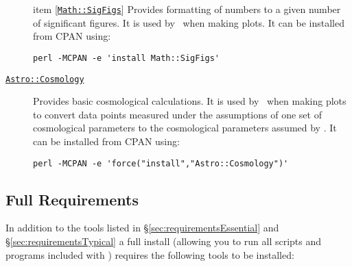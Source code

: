 \begin{description}
item [\href{http://search.cpan.org/~sbeck/Math-SigFigs-1.09/lib/Math/SigFigs.pod}{{\tt Math::SigFigs}}] Provides formatting of numbers to a given number of significant figures. It is used by \glc\ when making plots. It can be installed from CPAN using:
\begin{verbatim}
perl -MCPAN -e 'install Math::SigFigs'
\end{verbatim}

\item [\href{http://search.cpan.org/~djburke/Astro-Cosmology-0.90/Cosmology.pm}{{\tt Astro::Cosmology}}] Provides basic cosmological calculations. It is used by \glc\ when making plots to convert data points measured under the assumptions of one set of cosmological parameters to the cosmological parameters assumed by \glc. It can be installed from CPAN using:
\begin{verbatim}
perl -MCPAN -e 'force("install","Astro::Cosmology")'
\end{verbatim}
\end{description}

\subsection{Full Requirements}\label{sec:requirementsFull}

In addition to the tools listed in \S\ref{sec:requirementsEssential} and \S\ref{sec:requirementsTypical} a full install (allowing you to run all scripts and programs included with \glc) requires the following tools to be installed:

